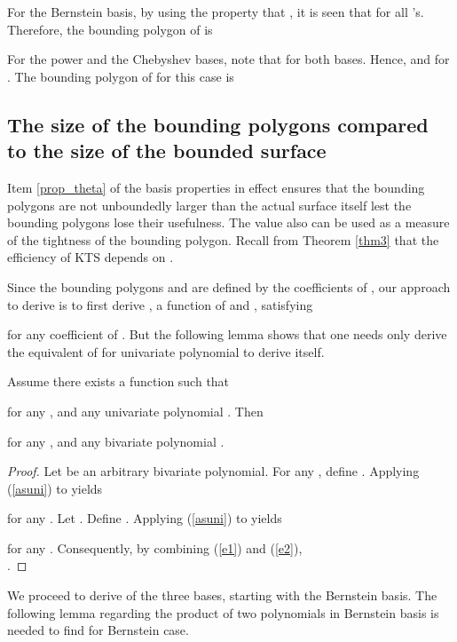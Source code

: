 \documentclass[12pt]{article}
\begin{document}
For the Bernstein basis,
by using the property that , it is seen that
 for all 's.  Therefore, the bounding polygon of
 is


For the power and the Chebyshev bases, note that 
for both bases.  Hence,  and  for
.  The bounding polygon of  for this case is



\subsection{The size of the bounding polygons compared to the size of the bounded surface}

Item \ref{prop_theta} of the basis properties in effect ensures that the bounding polygons
are not unboundedly larger than the actual surface itself lest the bounding polygons
lose their usefulness.  The value  also can be used as a measure of the
tightness of the bounding polygon.  Recall from Theorem \ref{thm3} that the
efficiency of KTS depends on .

Since the bounding polygons  and  are defined by the coefficients of ,
our approach to derive  is to first derive , a function of  and , satisfying

for any coefficient  of .
But the following lemma shows that one needs only derive
the equivalent of  for univariate polynomial to derive  itself.

\begin{lemma}
\label{uni_theta_to_bi}
Assume there exists a function  such that

for any  , and any univariate polynomial .
Then

for any   , and any
bivariate polynomial .
\begin{proof}




Let  be an arbitrary bivariate polynomial.  For any , define .  Applying (\ref{asuni}) to  yields

for any .  Let .  Define .  Applying (\ref{asuni}) to  yields

for any .  Consequently, by combining (\ref{e1}) and (\ref{e2}), \\ .
\end{proof}
\end{lemma}

We proceed to derive  of the three bases, starting with the Bernstein basis.
The following lemma regarding the product
of two polynomials in Bernstein basis is needed to find 
for Bernstein case.
\end{document}
